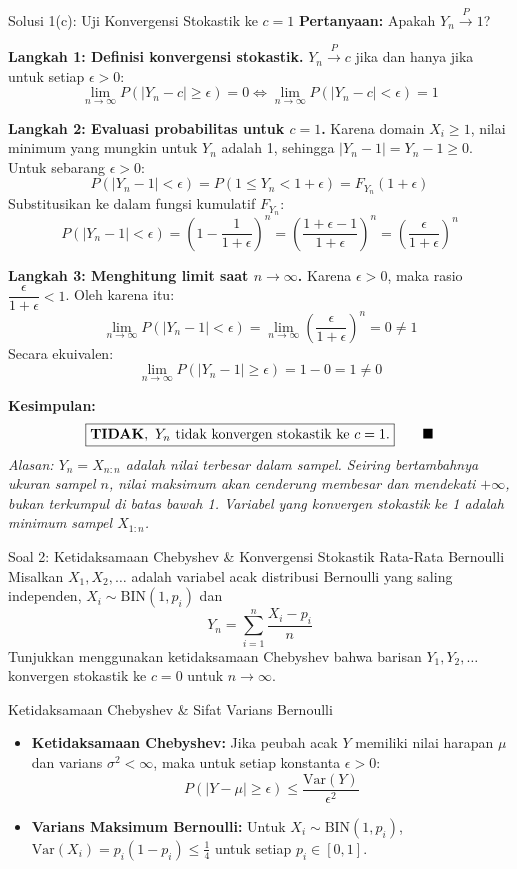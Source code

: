 \documentclass[10pt,twoside]{article}
\begin{document}
\begin{solbox}{Solusi 1(c): Uji Konvergensi Stokastik ke $c = 1$}
\textbf{Pertanyaan:} Apakah $Y_n \xrightarrow{P} 1$?

\textbf{Langkah 1: Definisi konvergensi stokastik.}
$Y_n \xrightarrow{P} c$ jika dan hanya jika untuk setiap $\epsilon > 0$:
\[
\lim_{n \to \infty} P(|Y_n - c| \ge \epsilon) = 0 \iff \lim_{n \to \infty} P(|Y_n - c| < \epsilon) = 1
\]

\textbf{Langkah 2: Evaluasi probabilitas untuk $c = 1$.}
Karena domain $X_i \ge 1$, nilai minimum yang mungkin untuk $Y_n$ adalah 1, sehingga $|Y_n - 1| = Y_n - 1 \ge 0$.
Untuk sebarang $\epsilon > 0$:
\[
P(|Y_n - 1| < \epsilon) = P(1 \le Y_n < 1 + \epsilon) = F_{Y_n}(1 + \epsilon)
\]
Substitusikan ke dalam fungsi kumulatif $F_{Y_n}$:
\[
P(|Y_n - 1| < \epsilon) = \left(1 - \frac{1}{1 + \epsilon}\right)^n = \left(\frac{1 + \epsilon - 1}{1 + \epsilon}\right)^n = \left(\frac{\epsilon}{1 + \epsilon}\right)^n
\]

\textbf{Langkah 3: Menghitung limit saat $n \to \infty$.}
Karena $\epsilon > 0$, maka rasio $\dfrac{\epsilon}{1 + \epsilon} < 1$. Oleh karena itu:
\[
\lim_{n \to \infty} P(|Y_n - 1| < \epsilon) = \lim_{n \to \infty} \left(\frac{\epsilon}{1 + \epsilon}\right)^n = 0 \ne 1
\]
Secara ekuivalen:
\[
\lim_{n \to \infty} P(|Y_n - 1| \ge \epsilon) = 1 - 0 = 1 \ne 0
\]

\textbf{Kesimpulan:}
\[
\boxed{\text{\textbf{TIDAK}}, \ Y_n \ \text{tidak konvergen stokastik ke } c = 1.} \qquad \blacksquare
\]
\textit{Alasan: $Y_n = X_{n:n}$ adalah nilai terbesar dalam sampel. Seiring bertambahnya ukuran sampel $n$, nilai maksimum akan cenderung membesar dan mendekati $+\infty$, bukan terkumpul di batas bawah 1. Variabel yang konvergen stokastik ke 1 adalah minimum sampel $X_{1:n}$.}
\end{solbox}

\begin{soalbox}{Soal 2: Ketidaksamaan Chebyshev \& Konvergensi Stokastik Rata-Rata Bernoulli}
Misalkan $X_1, X_2, \dots$ adalah variabel acak distribusi Bernoulli yang saling independen, $X_i \sim \text{BIN}(1, p_i)$ dan
\[
Y_n = \sum_{i=1}^{n} \frac{X_i - p_i}{n}
\]
Tunjukkan menggunakan ketidaksamaan Chebyshev bahwa barisan $Y_1, Y_2, \dots$ konvergen stokastik ke $c = 0$ untuk $n \to \infty$.
\end{soalbox}

\begin{tipbox}{Ketidaksamaan Chebyshev \& Sifat Varians Bernoulli}
\begin{itemize}
  \item \textbf{Ketidaksamaan Chebyshev:} Jika peubah acak $Y$ memiliki nilai harapan $\mu$ dan varians $\sigma^2 < \infty$, maka untuk setiap konstanta $\epsilon > 0$:
  \[
  P(|Y - \mu| \ge \epsilon) \le \frac{\mathrm{Var}(Y)}{\epsilon^2}
  \]
  \item \textbf{Varians Maksimum Bernoulli:} Untuk $X_i \sim \text{BIN}(1, p_i)$, $\mathrm{Var}(X_i) = p_i(1 - p_i) \le \frac{1}{4}$ untuk setiap $p_i \in [0, 1]$.
\end{itemize}
\end{tipbox}
\end{document}
